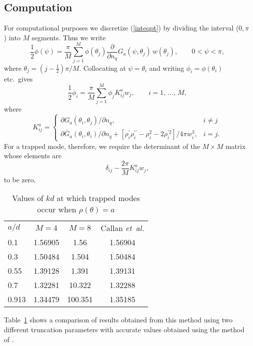 \documentclass{jfm}
\providecommand\upi{\pi}%
\providecommand\upi{\pi}%
\newcommand\p{\ensuremath{\partial}}
\newcommand\thalf{\ensuremath{{\textstyle\frac{1}{2}}}}
\newcommand\Gat{\ensuremath{\widetilde{G_a}}}
\newcommand\ndq{\ensuremath{\frac{\mbox{$\partial$}}{\mbox{$\partial$} n_q}}}
\newcommand\sumjm{\ensuremath{\sum_{j=1}^{M}}}
\newcommand\etal{\mbox{\textit{et al.}}}
\newcommand\etc{etc.\ }
\begin{document}
\subsection{Computation}

For computational purposes we discretize (\ref{inteqpt}) by dividing
the interval ($0,\upi$) into $M$ segments. Thus we write
\begin{equation}
  \thalf\phi(\psi) = \frac{\upi}{M} \sumjm\phi(\theta_j)\ndq
  G_a(\psi,\theta_j)\,w(\theta_j),
  \qquad 0<\psi<\upi,
  \label{phipsi}
\end{equation}
where $\theta_j=(j-\thalf)\upi/M$. Collocating at $\psi=\theta_i$ and
writing $\phi_i=\phi(\theta_i)$ \etc gives
\begin{equation}
  \thalf\phi_i = \frac{\upi}{M} \sumjm\phi_j K_{ij}^a w_j,
  \qquad i=1,\,\ldots,\,M,
\end{equation}
where
\begin{equation}
  K_{ij}^a = \left\{
    \begin{array}{ll}
      \p G_a(\theta_i,\theta_j)/\p n_q, & i\neq j \\[2pt]
      \p\Gat(\theta_i,\theta_i)/\p n_q
      + [\rho_i^{\prime}\rho_i^{\prime\prime}-\rho_i^2-2\rho_i^{\prime 2}]
      / 4\upi w_i^3, & i=j.
  \end{array} \right.
\end{equation}
For a trapped mode, therefore, we require the determinant of the
$M\times M$ matrix whose elements are
\[
  \delta_{ij}-\frac{2\upi}{M}K_{ij}^a w_j,
\]
to be zero.
%
\begin{table}
  \begin{center}
  \begin{tabular}{lccc}
      $a/d$  & $M=4$   &   $M=8$ & Callan \etal \\[3pt]
       0.1   & 1.56905 &   1.56  & 1.56904\\
       0.3   & 1.50484 &   1.504 & 1.50484\\
       0.55  & 1.39128 &   1.391 & 1.39131\\
       0.7   & 1.32281 &  10.322 & 1.32288\\
       0.913 & 1.34479 & 100.351 & 1.35185\\
  \end{tabular}
  \caption{Values of $kd$ at which trapped modes occur when $\rho(\theta)=a$}
  \label{tab:kd}
  \end{center}
\end{table}
%
Table~\ref{tab:kd} shows a comparison of results
obtained from this method using two different truncation parameters
with accurate values obtained using the method of
\cite[Callan \etal\ (1991)]{Callan91}.
\end{document}
